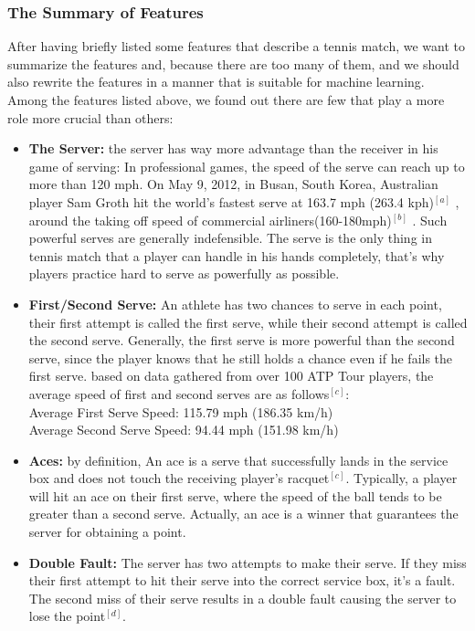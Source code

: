 \documentclass[UTF8]{mcmthesis}
\begin{document}
	\subsubsection{The Summary of Features}
	After having briefly listed some features that describe a tennis match, we want to summarize the features and, because there are too many of them, and we should also rewrite the features in a manner that is suitable for machine learning.\\
	Among the features listed above, we found out there are few that play a more role more crucial than others:\\
	\begin{itemize}
	\item \textbf{The Server:}
	 the server has way more advantage than the receiver in his game of serving: In professional games, the speed of the serve can reach up to more than 120 mph. On May 9, 2012, in Busan, South Korea, Australian player Sam Groth hit the world’s fastest serve at 163.7 mph (263.4 kph)$^{[a]}$ , around the taking off speed of commercial airliners(160-180mph)$^{[b]}$ . Such powerful serves are generally indefensible. The serve is the only thing in tennis match that a player can handle in his hands completely, that’s why players practice hard to serve as powerfully as possible.
	 \item \textbf{First/Second Serve:}
	 An athlete has two chances to serve in each point, their first attempt is called the first serve, while their second attempt is called the second serve. Generally, the first serve is more powerful than the second serve, since the player knows that he still holds a chance even if he fails the first serve. based on data gathered from over 100 ATP Tour players, the average speed of first and second serves are as follows$^{[c]}$: 
\\Average First Serve Speed: 115.79 mph (186.35 km/h)
\\Average Second Serve Speed: 94.44 mph (151.98 km/h)
    \item \textbf{Aces:}
     by definition, An ace is a serve that successfully lands in the service box and does not touch the receiving player’s racquet$^{[c]}$.  Typically, a player will hit an ace on their first serve, where the speed of the ball tends to be greater than a second serve. Actually, an ace is a winner that guarantees the server for obtaining a point.
     \item \textbf{Double Fault:}
      The server has two attempts to make their serve. If they miss their first attempt to hit their serve into the correct service box, it’s a fault. The second miss of their serve results in a double fault causing the server to lose the point$^{[d]}$. 

\end{itemize}
\end{document}
